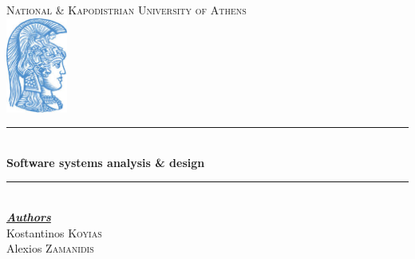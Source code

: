 \documentclass[12pt]{article}
\begin{document}
\begin{titlepage}

\newcommand{\HRule}{\rule{\linewidth}{0.5mm}} %

\center %

\textsc{\huge National \& Kapodistrian University of Athens}\\[1.5cm] %
\includegraphics[width=20mm,scale=0.5]{logo.jpeg}\\


\HRule \\[0.4cm]
{ \large \bfseries Software systems analysis \& design}\\[0.4cm] %
\HRule \\[1.5cm]
 

\large \emph{\textbf{\underline{Authors}}}\\
Kostantinos \textsc{Koyias} \\
Alexios \textsc{Zamanidis} 

 

\vfill %

\end{titlepage}
\end{document}

